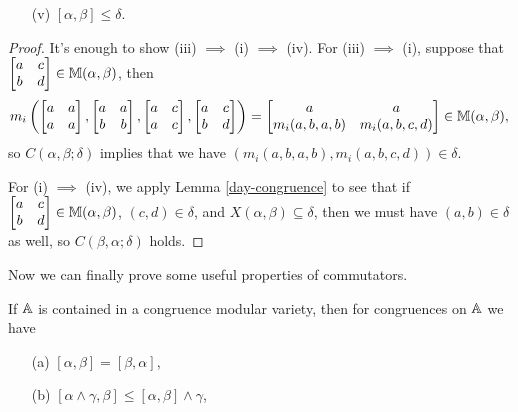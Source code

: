 \begin{appendices}
\begin{thm}
\begin{itemize}
\item[(v)] $[\alpha,\beta] \le \delta$.
\end{itemize}
\end{thm}
\begin{proof} It's enough to show (iii) $\implies$ (i) $\implies$ (iv). For (iii) $\implies$ (i), suppose that $\begin{bmatrix} a & c\\ b & d\end{bmatrix} \in \mathbb{M}(\alpha,\beta)$, then
\[
m_i\left(\begin{bmatrix} a & a\\ a & a\end{bmatrix}, \begin{bmatrix} a & a\\ b & b\end{bmatrix}, \begin{bmatrix} a & c\\ a & c\end{bmatrix}, \begin{bmatrix} a & c\\ b & d\end{bmatrix}\right) = \begin{bmatrix} a & a\\ m_i(a,b,a,b) & m_i(a,b,c,d)\end{bmatrix} \in \mathbb{M}(\alpha,\beta),
\]
so $C(\alpha,\beta;\delta)$ implies that we have $(m_i(a,b,a,b),m_i(a,b,c,d)) \in \delta$.

For (i) $\implies$ (iv), we apply Lemma \ref{day-congruence} to see that if $\begin{bmatrix} a & c\\ b & d\end{bmatrix} \in \mathbb{M}(\alpha,\beta)$, $(c,d) \in \delta$, and $X(\alpha,\beta) \subseteq \delta$, then we must have $(a,b) \in \delta$ as well, so $C(\beta,\alpha;\delta)$ holds.
\end{proof}

Now we can finally prove some useful properties of commutators.

\begin{prop}\label{mod-commutator} If $\mathbb{A}$ is contained in a congruence modular variety, then for congruences on $\mathbb{A}$ we have
\begin{itemize}
\item[(a)] $[\alpha,\beta] = [\beta,\alpha]$,

\item[(b)] $[\alpha \wedge \gamma, \beta] \le [\alpha,\beta]\wedge \gamma$,


\end{itemize}
\end{prop}
\end{appendices}

